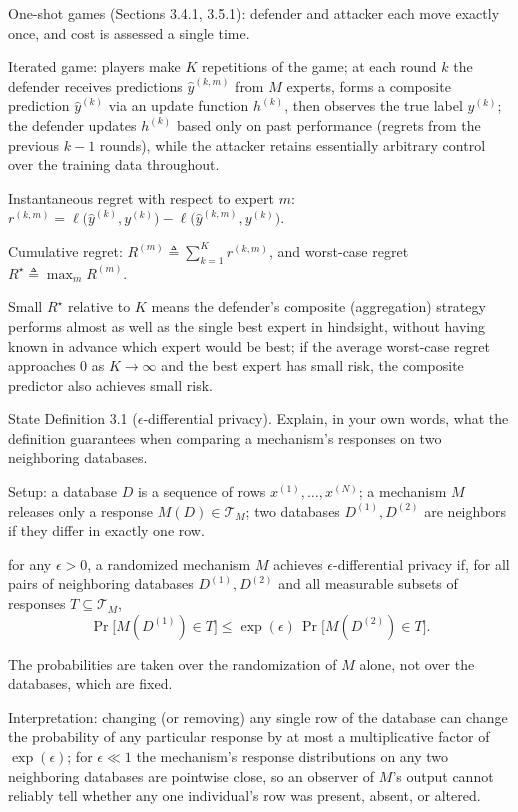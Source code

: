 \documentclass[10pt]{extarticle}
\newcommand{\resposta}[1]{\par\smallskip\noindent #1}
\begin{document}
\begin{questoes}
\resposta{
\begin{topicos}
\item One-shot games (Sections 3.4.1, 3.5.1): defender and attacker each move exactly once, and cost is assessed a single time.
\item Iterated game: players make $K$ repetitions of the game; at each round $k$ the defender receives predictions $\hat{y}^{(k,m)}$ from $M$ experts, forms a composite prediction $\hat{y}^{(k)}$ via an update function $h^{(k)}$, then observes the true label $y^{(k)}$; the defender updates $h^{(k)}$ based only on past performance (regrets from the previous $k-1$ rounds), while the attacker retains essentially arbitrary control over the training data throughout.
\item Instantaneous regret with respect to expert $m$: $r^{(k,m)} = \ell\big(\hat{y}^{(k)}, y^{(k)}\big) - \ell\big(\hat{y}^{(k,m)}, y^{(k)}\big)$.
\item Cumulative regret: $\displaystyle R^{(m)} \triangleq \sum_{k=1}^{K} r^{(k,m)}$, and worst-case regret $\displaystyle R^\star \triangleq \max_m R^{(m)}$.
\item Small $R^\star$ relative to $K$ means the defender's composite (aggregation) strategy performs almost as well as the single best expert in hindsight, without having known in advance which expert would be best; if the average worst-case regret approaches 0 as $K \to \infty$ and the best expert has small risk, the composite predictor also achieves small risk.
\end{topicos}
}

\item State Definition 3.1 ($\epsilon$-differential privacy). Explain, in your own words, what the definition guarantees when comparing a mechanism's responses on two neighboring databases.

\resposta{
\begin{topicos}
\item Setup: a database $D$ is a sequence of rows $x^{(1)}, \ldots, x^{(N)}$; a mechanism $M$ releases only a response $M(D) \in \mathcal{T}_M$; two databases $D^{(1)}, D^{(2)}$ are neighbors if they differ in exactly one row.
\item[Definition 3.1:] for any $\epsilon > 0$, a randomized mechanism $M$ achieves $\epsilon$-differential privacy if, for all pairs of neighboring databases $D^{(1)}, D^{(2)}$ and all measurable subsets of responses $T \subseteq \mathcal{T}_M$,
\[
\Pr\big[M(D^{(1)}) \in T\big] \leq \exp(\epsilon)\, \Pr\big[M(D^{(2)}) \in T\big].
\]
\item The probabilities are taken over the randomization of $M$ alone, not over the databases, which are fixed.
\item Interpretation: changing (or removing) any single row of the database can change the probability of any particular response by at most a multiplicative factor of $\exp(\epsilon)$; for $\epsilon \ll 1$ the mechanism's response distributions on any two neighboring databases are pointwise close, so an observer of $M$'s output cannot reliably tell whether any one individual's row was present, absent, or altered.
\end{topicos}
}


\end{questoes}
\end{document}
